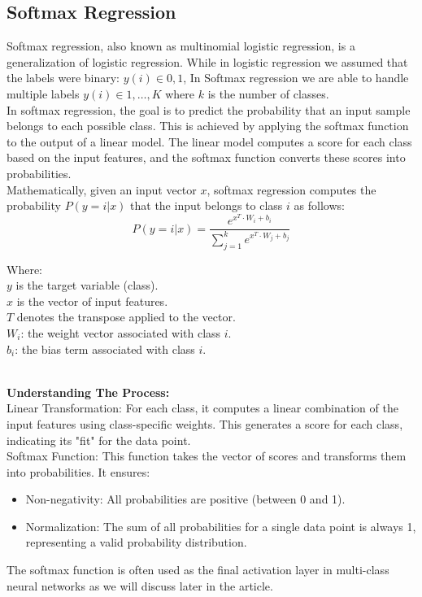 \documentclass{article}
\begin{document}
\subsection{Softmax Regression}
Softmax regression, also known as multinomial logistic regression, is a generalization of logistic regression.
While in logistic regression we assumed that the labels were binary: ${y(i)\in{0,1}}$, In Softmax regression we are able to handle multiple labels ${y(i)\in{1,…,K}}$ where ${k}$ is the number of classes.\\
In softmax regression, the goal is to predict the probability that an input sample belongs to each possible class. This is achieved by applying the softmax function to the output of a linear model. The linear model computes a score for each class based on the input features, and the softmax function converts these scores into probabilities.\\
Mathematically, given an input vector ${x}$, softmax regression computes the probability ${P(y=i | x)}$ that the input belongs to class ${i}$ as follows:
$${P(y=i | x) = \frac{e^{x^{T} \cdot W_i + b_i}}{\sum_{j=1}^{k} e^{x^{T} \cdot W_j + b_j}}
        }$$

\noindent\hspace*{10mm}
\begin{minipage}{\dimexpr\linewidth-20mm}
    Where:\\
    ${y}$ is the target variable (class).\\
    ${x}$ is the vector of input features.\\
    ${T}$ denotes the transpose applied to the vector.\\
    ${W_i}$: the weight vector associated with class ${i}$.\\
    ${b_i}$: the bias term associated with class ${i}$.\\
\end{minipage}\\
\textbf{Understanding The Process:}\hfill\newline\\
Linear Transformation: For each class, it computes a linear combination of the input features using class-specific weights. This generates a score for each class, indicating its "fit" for the data point.\hfill\newline\\
Softmax Function: This function takes the vector of scores and transforms them into probabilities. It ensures:
\begin{itemize}
    \item Non-negativity: All probabilities are positive (between 0 and 1).
\end{itemize}
\begin{itemize}
    \item Normalization: The sum of all probabilities for a single data point is always 1, representing a valid probability distribution.
\end{itemize}
The softmax function is often used as the final activation layer in multi-class neural networks as we will discuss later in the article.
\end{document}
